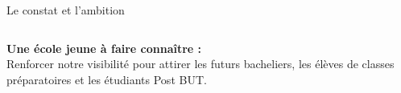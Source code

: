 \documentclass[10pt,aspectratio=169]{beamer}
\begin{document}
\begin{frame}[shrink=15]{Le constat et l'ambition}
    \begin{tcolorbox}[
        colback=white,
        colframe=ensarorange,
        boxrule=1pt,
        arc=2pt,
        left=6pt,
        right=6pt,
        top=4pt,
        bottom=4pt,
        colbacktitle=ensarorange,
        coltitle=white,
        title={\textbf{L'AMBITION DE L'ÉCOLE}},
        fonttitle=\footnotesize\bfseries\sffamily
    ]
        \begin{columns}[c]
            \begin{column}{0.75\textwidth}
                {\scriptsize \textbf{Une école jeune à faire connaître :}}\\[0.02cm]
                {\scriptsize Renforcer notre visibilité pour attirer les futurs bacheliers, les élèves de classes préparatoires et les étudiants Post BUT.}
            \end{column}
            \begin{column}{0.25\textwidth}
                \centering
                {\large\color{ensarorange}}
            \end{column}
        \end{columns}
    \end{tcolorbox}
\end{frame}
\end{document}

